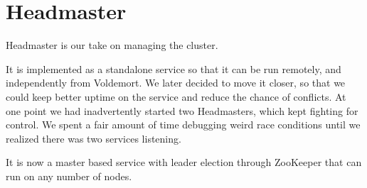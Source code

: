 
\section{Headmaster}
Headmaster is our take on managing the cluster.

It is implemented as a standalone service so that it can be run remotely, and independently from Voldemort.
We later decided to move it closer, so that we could keep better uptime on the service and reduce the chance of conflicts.
At one point we had inadvertently started two Headmasters, which kept fighting for control.
We spent a fair amount of time debugging weird race conditions until we realized there was two services listening.

It is now a master based service with leader election through ZooKeeper that can run on any number of nodes.
